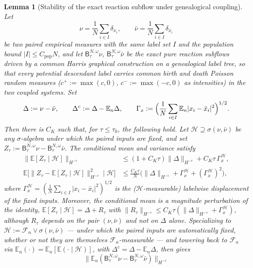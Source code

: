 \documentclass[a4paper,fleqn]{cas-sc}
\newtheorem{lemma}[theorem]{Lemma}
\theoremstyle{definition}
\theoremstyle{remark}
\begin{document}
\begin{lemma}[Stability of the exact reaction subflow under genealogical coupling]\label{lem:Bstab}
Let
\[
\nu=\frac1N\sum_{i\in I}\delta_{x_i},
\qquad
\bar\nu=\frac1N\sum_{i\in I}\delta_{\bar x_i}
\]
be two paired empirical measures with the same label set $I$ and the population
bound $|I|\le C_{\mathrm{pop}}N$, and let $\mathsf B^{N,\omega}_\tau\nu$,
$\mathsf B^{N,\omega}_\tau\bar\nu$ be the exact pure reaction subflows driven by a
common Harris graphical construction on a genealogical label tree, so that every
potential descendant label carries common birth and death Poisson random measures
($c^+:=\max(c,0)$, $c^-:=\max(-c,0)$ as intensities) in the two coupled systems.
Set
\[
\Delta:=\nu-\bar\nu,\qquad
\Delta^c:=\Delta-\mathbb E_n\Delta,
\qquad
\Gamma_x:=\Bigl(\frac1N\sum_{i\in I}\mathbb E_n|x_i-\bar x_i|^2\Bigr)^{1/2}.
\]
Then there is $C_K$ such that, for $\tau\le\tau_0$, the following hold. Let
$\mathcal H\supseteq\sigma(\nu,\bar\nu)$ be any $\sigma$-algebra under which the
paired inputs are fixed, and set $Z_\tau:=\mathsf B^{N,\omega}_\tau\nu
-\mathsf B^{N,\omega}_\tau\bar\nu$. The conditional mean and variance satisfy
\begin{align}
\bigl\|\mathbb E[Z_\tau\mid\mathcal H]\bigr\|_{H^{-s}}
&\le (1+C_K\tau)\|\Delta\|_{H^{-s}}+C_K\tau\,\Gamma_x^{\mathcal H},
\label{eq:Bstab-cond-mean}\\
\mathbb E\bigl[\|Z_\tau-\mathbb E[Z_\tau\mid\mathcal H]\|_{H^{-s}}^2\mid\mathcal H\bigr]
&\le\frac{C_K\tau}{N}\bigl(\|\Delta\|_{H^{-s}}+\Gamma_x^{\mathcal H}+(\Gamma_x^{\mathcal H})^2\bigr),
\label{eq:Bstab-cond-var}
\end{align}
where $\Gamma_x^{\mathcal H}=(\frac1N\sum_{i\in I}|x_i-\bar x_i|^2)^{1/2}$ is the
($\mathcal H$-measurable) labelwise displacement of the fixed inputs. Moreover, the
conditional mean is a magnitude perturbation of the identity,
$\mathbb E[Z_\tau\mid\mathcal H]=\Delta+R_\tau$ with
$\|R_\tau\|_{H^{-s}}\le C_K\tau(\|\Delta\|_{H^{-s}}+\Gamma_x^{\mathcal H})$, although
$R_\tau$ depends on the pair $(\nu,\bar\nu)$ and not on $\Delta$ alone. Specializing to
$\mathcal H:=\mathcal F_n\vee\sigma(\nu,\bar\nu)$ --- under which the paired inputs are
automatically fixed, whether or not they are themselves $\mathcal F_n$-measurable ---
and towering back to $\mathcal F_n$ via
$\mathbb E_n(\cdot)=\mathbb E_n[\mathbb E(\cdot\mid\mathcal H)]$, with
$\Delta^c=\Delta-\mathbb E_n\Delta$, then gives
\begin{equation}\label{eq:Bstab-mean}
\bigl\|\mathbb E_n(\mathsf B^{N,\omega}_\tau\nu-\mathsf B^{N,\omega}_\tau\bar\nu)\bigr\|_{H^{-s}}

\end{equation}
\end{lemma}
\end{document}
